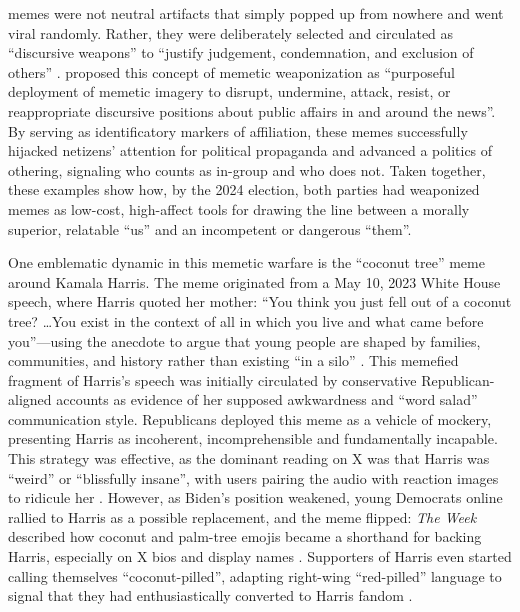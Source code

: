 \documentclass[12pt,twoside]{article}
\begin{document}
 memes were not neutral artifacts that simply popped up from nowhere and went viral randomly. Rather, they were deliberately selected and circulated as ``discursive weapons'' to ``justify judgement, condemnation, and exclusion of others'' \parencite[495]{nissenbaum2017contestedculturalcapital}. \textcite{peters2021weaponizingmemes} proposed this concept of memetic weaponization as ``purposeful deployment of memetic imagery to disrupt, undermine, attack, resist, or reappropriate discursive positions about public affairs in and around the news''. By serving as identificatory markers of affiliation, these memes successfully hijacked netizens' attention for political propaganda \parencite{olsen2018weaponizedmemes} and advanced a politics of othering, signaling who counts as in-group and who does not.
Taken together, these examples show how, by the 2024 election, both parties had weaponized memes as low-cost, high-affect tools for drawing the line between a morally superior, relatable ``us'' and an incompetent or dangerous ``them''. 


One emblematic dynamic in this memetic warfare is the ``coconut tree'' meme around Kamala Harris. The meme originated from a May 10, 2023 White House speech, where Harris quoted her mother: ``You think you just fell out of a coconut tree? \dots You exist in the context of all in which you live and what came before you''---using the anecdote to argue that young people are shaped by families, communities, and history rather than existing ``in a silo'' \parencite{harris2023swearinginremarks}. This memefied fragment of Harris's speech was initially circulated by conservative Republican-aligned accounts as evidence of her supposed awkwardness and ``word salad'' communication style. Republicans deployed this meme as a vehicle of mockery, presenting Harris as incoherent, incomprehensible and fundamentally incapable. This strategy was effective, as the dominant reading on X was that Harris was ``weird'' or ``blissfully insane'', with users pairing the audio with reaction images to ridicule her \parencite{carry2024coconuttreeguide}. However, as Biden's position weakened, young Democrats online rallied to Harris as a possible replacement, and the meme flipped: \textit{The Week} described how coconut and palm-tree emojis became a shorthand for backing Harris, especially on X bios and display names \parencite{coleman2024coconutmeme}. Supporters of Harris even started calling themselves ``coconut-pilled'', adapting right-wing ``red-pilled'' language to signal that they had enthusiastically converted to Harris fandom \parencite{roberts2024coconuttreeorganic}.
\end{document}
